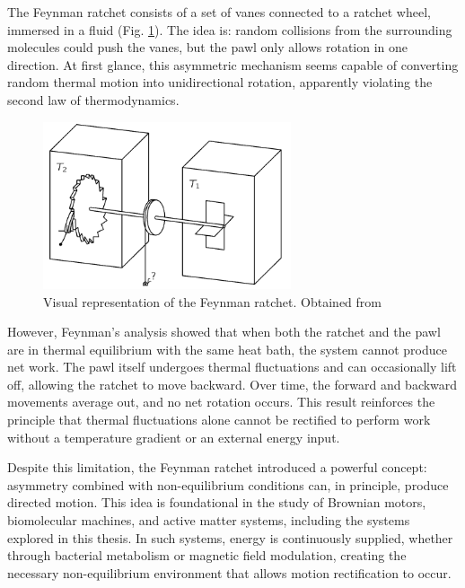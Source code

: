 The Feynman ratchet consists of a set of vanes connected to a ratchet wheel, immersed in a fluid (Fig. \ref{fig:feynmanratchet}). The idea is: random collisions from the surrounding molecules could push the vanes, but the pawl only allows rotation in one direction. At first glance, this asymmetric mechanism seems capable of converting random thermal motion into unidirectional rotation, apparently violating the second law of thermodynamics.

\begin{figure}
  \begin{center}
    \includegraphics[width=0.65\textwidth]{figures/feynmanratchet.png}
  \end{center}
  \caption[Feynman ratchet]{Visual representation of the Feynman ratchet. Obtained from \cite{feynman1963feynman}}\label{fig:feynmanratchet}
\end{figure}


However, Feynman's analysis showed that when both the ratchet and the pawl are in thermal equilibrium with the same heat bath, the system cannot produce net work. The pawl itself undergoes thermal fluctuations and can occasionally lift off, allowing the ratchet to move backward. Over time, the forward and backward movements average out, and no net rotation occurs. This result reinforces the principle that thermal fluctuations alone cannot be rectified to perform work without a temperature gradient or an external energy input.

Despite this limitation, the Feynman ratchet introduced a powerful concept: asymmetry combined with non-equilibrium conditions can, in principle, produce directed motion. This idea is foundational in the study of Brownian motors, biomolecular machines, and active matter systems, including the systems explored in this thesis. In such systems, energy is continuously supplied, whether through bacterial metabolism or magnetic field modulation, creating the necessary non-equilibrium environment that allows motion rectification to occur.

